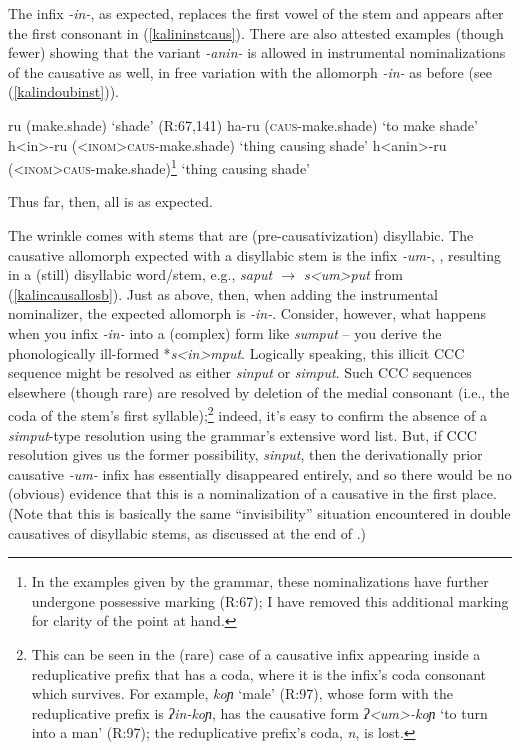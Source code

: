 \documentclass[output=paper]{langscibook}
\begin{document}
\noindent The infix \textit{-in-}, as expected, replaces the first vowel of the stem and appears after the first consonant in (\ref{kalininstcaus}). There are also attested examples (though fewer) showing that the variant \textit{-anin-} is allowed in instrumental nominalizations of the causative as well, in free variation with the allomorph \textit{-in-} as before (see (\ref{kalindoubinst})).

\ea \ea ru (make.shade) \hfill `shade' (R:67,141)
\ex ha-ru (\textsc{caus-}make.shade) \hfill `to make shade'
\ex h<in>-ru (\textsc{<inom>caus-}make.shade) \hfill `thing causing shade'
\ex h<anin>-ru (\textsc{<inom>caus-}make.shade)\footnote{In the examples given by the grammar, these nominalizations have further undergone possessive marking (R:67); I have removed this additional marking for clarity of the point at hand.} \hfill `thing causing shade'
\z
\z

\noindent Thus far, then, all is as expected.

The wrinkle comes with stems that are (pre-causativization) disyllabic. The causative allomorph expected with a disyllabic stem is the infix \textit{-um-}, , resulting in a (still) disyllabic word/stem, e.g., \textit{saput $\rightarrow$ s<um>put} from (\ref{kalincausallosb}). Just as above, then, when adding the instrumental nominalizer, the expected allomorph is \textit{-in-}. Consider, however, what happens when you infix \textit{-in-} into a (complex) form like \textit{sumput} -- you derive the phonologically ill-formed *\textit{s<in>mput}. Logically speaking, this illicit CCC sequence might be resolved as either \textit{si{np}ut} or \textit{si{mp}ut}. Such CCC sequences elsewhere (though rare) are resolved by deletion of the medial consonant (i.e., the coda of the stem's first syllable);\footnote{This can be seen in the (rare) case of a causative infix appearing inside a reduplicative prefix that has a coda, where it is the infix's coda consonant which survives. For example, \textit{koɲ} `male' (R:97), whose form with the reduplicative prefix is \textit{ʔin-koɲ}, has the causative form \textit{ʔ<um>-koɲ} `to turn into a man' (R:97); the reduplicative prefix's coda, \textit{n}, is lost.\label{kalinCCCfn}} indeed, it's easy to confirm the absence of a \textit{si{mp}ut}-type resolution using the grammar's extensive word list. But, if CCC resolution gives us the former possibility, \textit{sinput}, then the derivationally prior causative \textit{-um-} infix has essentially disappeared entirely, and so there would be no (obvious) evidence that this is a nominalization of a causative in the first place. (Note that this is basically the same ``invisibility'' situation encountered in double causatives of disyllabic stems, as discussed at the end of .)
\end{document}
